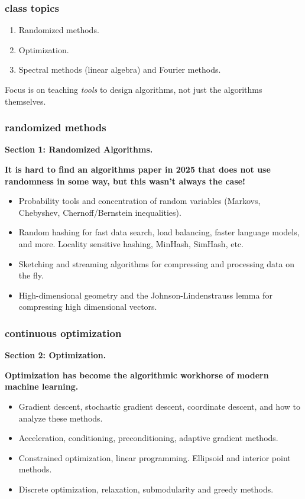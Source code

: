 \documentclass[]{beamer}
\begin{document}
	\begin{frame}
		\frametitle{class topics}
		\begin{center}
			\begin{enumerate}[label=(\arabic*)]
				\item Randomized methods.
				\item Optimization.
				\item Spectral methods (linear algebra) and Fourier methods.
			\end{enumerate}
			
			\vspace{1em}
			Focus is on teaching \emph{tools} to design algorithms, not just the algorithms themselves. 
		\end{center}
	\end{frame}
	
	\begin{frame}
		\frametitle{randomized methods}
		\small
		\textbf{Section 1: Randomized Algorithms.}
		
		\alert{\textbf{It is hard to find an algorithms paper in 2025 that does not use randomness in some way, but this wasn't always the case!}}
		\begin{itemize}
			\item Probability tools and concentration of random variables (Markovs, Chebyshev, Chernoff/Bernstein inequalities).
			\item Random hashing for fast data search, load balancing, faster language models, and more. Locality sensitive hashing, MinHash, SimHash, etc.
			\item Sketching and streaming algorithms for compressing and processing data on the fly.
			\item High-dimensional geometry and the Johnson-Lindenstrauss lemma for compressing high dimensional vectors.
		\end{itemize}
	\end{frame}
	
	\begin{frame}
		\frametitle{continuous optimization}
		\small
		\textbf{Section 2: Optimization.}
		
		\alert{\textbf{Optimization has become the algorithmic workhorse of modern machine learning.}}
		\begin{itemize}
			\item Gradient descent, stochastic gradient descent, coordinate descent, and how to analyze these methods.
			\item Acceleration, conditioning, preconditioning, adaptive gradient methods.
			\item Constrained optimization, linear programming. Ellipsoid and interior point methods.
			\item Discrete optimization, relaxation, submodularity and greedy methods.
		\end{itemize}
	\end{frame}
	
\end{document}
